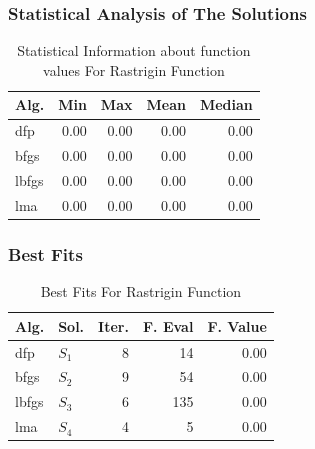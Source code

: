 \documentclass[conference]{IEEEtran}
\begin{document}
\subsubsection{Statistical Analysis of The Solutions}
\label{statisticalanalysisrastrigin30d30D}

\begin{table}[H]
\centering
\caption{Statistical Information about function values For Rastrigin Function}
\label{function_values:rastrigin30d}
\begin{tabular}{lrrrr}
\toprule
 Alg. &  Min &  Max &  Mean &  Median \\
\midrule
  dfp & 0.00 & 0.00 &  0.00 &    0.00 \\
 bfgs & 0.00 & 0.00 &  0.00 &    0.00 \\
lbfgs & 0.00 & 0.00 &  0.00 &    0.00 \\
  lma & 0.00 & 0.00 &  0.00 &    0.00 \\
\bottomrule
\end{tabular}
\end{table}

\subsubsection{Best Fits}
\label{bestfitsrastrigin30d30D}

\begin{table}[H]
\centering
\caption{Best Fits For Rastrigin Function}
\label{solutions:rastrigin30d}
\begin{tabular}{llrrr}
\toprule
 Alg. &    Sol. &  Iter. &  F. Eval &  F. Value \\
\midrule
  dfp & $S_{1}$ &      8 &       14 &      0.00 \\
 bfgs & $S_{2}$ &      9 &       54 &      0.00 \\
lbfgs & $S_{3}$ &      6 &      135 &      0.00 \\
  lma & $S_{4}$ &      4 &        5 &      0.00 \\
\bottomrule
\end{tabular}
\end{table}
\end{document}
